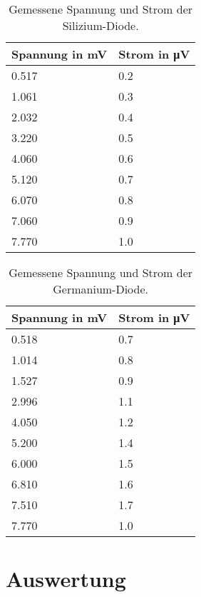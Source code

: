 \documentclass[
12pt,
a4paper,
bibliography=totocnumbered, %
BCOR=1cm, %
oneside, %
]{scrartcl}
\begin{document}
\begin{table}[H]
	\centering %
	\caption{Gemessene Spannung und Strom der Silizium-Diode.\label{tbl:SiSperr}}
	\begin{tabular}{ll}
		\toprule
		Spannung in \si{\milli\volt} & Strom in \si{\micro\volt} \\
		\midrule
		\num{0,517} & \num{0,2} \\
		\num{1,061} & \num{0,3} \\
		\num{2,032} & \num{0,4} \\
		\num{3,220} & \num{0,5} \\
		\num{4,060} & \num{0,6} \\
		\num{5,120} & \num{0,7} \\
		\num{6,070} & \num{0,8} \\
		\num{7,060} & \num{0,9} \\
		\num{7,770} & \num{1,0} \\
		\bottomrule
	\end{tabular}
\end{table}

\begin{table}[H]
	\centering %
	\caption{Gemessene Spannung und Strom der Germanium-Diode.\label{tbl:GeSperr}}
	\begin{tabular}{ll}
		\toprule
		Spannung in \si{\milli\volt} & Strom in \si{\micro\volt} \\
		\midrule
		\num{0,518} & \num{0,7} \\
		\num{1,014} & \num{0,8} \\
		\num{1,527} & \num{0,9} \\
		\num{2,996} & \num{1,1} \\
		\num{4,050} & \num{1,2} \\
		\num{5,200} & \num{1,4} \\
		\num{6,000} & \num{1,5} \\
		\num{6,810} & \num{1,6} \\
		\num{7,510} & \num{1,7} \\
		\num{7,770} & \num{1,0} \\
		\bottomrule
	\end{tabular}
\end{table}




\section{Auswertung}
\end{document}
